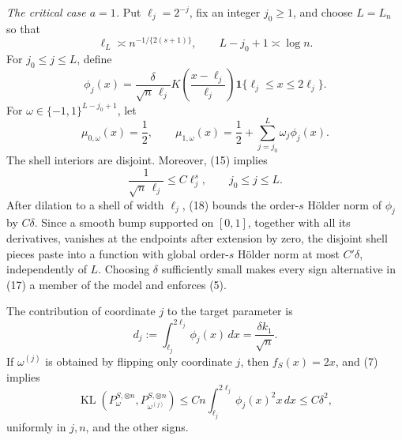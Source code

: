 \emph{The critical case \(a=1\).}
Put \(\ell_j=2^{-j}\), fix an integer \(j_0\ge1\), and choose \(L=L_n\) so that
\[
 \ell_L\asymp n^{-1/\{2(s+1)\}},
 \qquad
 L-j_0+1\asymp\log n.
\tag{15}
\]
For \(j_0\le j\le L\), define
\[
 \phi_j(x)=\frac{\delta}{\sqrt n\,\ell_j}
 K\!\left(\frac{x-\ell_j}{\ell_j}\right)
 \mathbf 1\{\ell_j\le x\le2\ell_j\}.
\tag{16}
\]
For \(\omega\in\{-1,1\}^{L-j_0+1}\), let
\[
 \mu_{0,\omega}(x)=\frac12,
 \qquad
 \mu_{1,\omega}(x)=\frac12+
 \sum_{j=j_0}^L\omega_j\phi_j(x).
\tag{17}
\]
The shell interiors are disjoint. Moreover, (15) implies
\[
 \frac1{\sqrt n\,\ell_j}
 \le C\ell_j^s,
 \qquad j_0\le j\le L.
\tag{18}
\]
After dilation to a shell of width \(\ell_j\), (18) bounds the order-\(s\) Hölder norm of \(\phi_j\) by \(C\delta\). Since a smooth bump supported on \([0,1]\), together with all its derivatives, vanishes at the endpoints after extension by zero, the disjoint shell pieces paste into a function with global order-\(s\) Hölder norm at most \(C'\delta\), independently of \(L\). Choosing \(\delta\) sufficiently small makes every sign alternative in (17) a member of the model and enforces (5).

The contribution of coordinate \(j\) to the target parameter is
\[
 d_j:=\int_{\ell_j}^{2\ell_j}\phi_j(x)\,dx
 =\frac{\delta k_1}{\sqrt n}.
\tag{19}
\]
If \(\omega^{(j)}\) is obtained by flipping only coordinate \(j\), then \(f_S(x)=2x\), and (7) implies
\[
 \operatorname{KL}(P_\omega^{S,\otimes n},
                    P_{\omega^{(j)}}^{S,\otimes n})
 \le Cn\int_{\ell_j}^{2\ell_j}\phi_j(x)^2x\,dx
 \le C\delta^2,
\tag{20}
\]
uniformly in \(j,n\), and the other signs.

